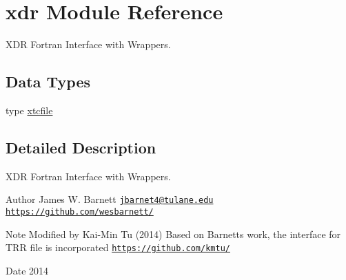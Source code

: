 \hypertarget{namespacexdr}{}\section{xdr Module Reference}
\label{namespacexdr}


X\+DR Fortran Interface with Wrappers.  


\subsection*{Data Types}
\begin{DoxyCompactItemize}
\item 
type \hyperlink{structxdr_1_1xtcfile}{xtcfile}
\end{DoxyCompactItemize}


\subsection{Detailed Description}
X\+DR Fortran Interface with Wrappers. 

\begin{DoxyAuthor}{Author}
James W. Barnett \href{mailto:jbarnet4@tulane.edu}{\tt jbarnet4@tulane.\+edu} \href{https://github.com/wesbarnett/}{\tt https\+://github.\+com/wesbarnett/} 
\end{DoxyAuthor}
\begin{DoxyNote}{Note}
Modified by Kai-\/\+Min Tu (2014) Based on Barnett\textquotesingle{}s work, the interface for T\+RR file is incorporated \href{https://github.com/kmtu/}{\tt https\+://github.\+com/kmtu/} 
\end{DoxyNote}
\begin{DoxyDate}{Date}
2014 
\end{DoxyDate}
